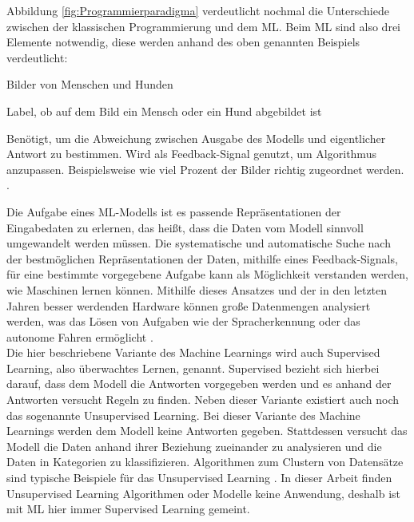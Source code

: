 Abbildung \ref*{fig:Programmierparadigma} verdeutlicht nochmal die Unterschiede zwischen der klassischen Programmierung und dem \ac{ML}. Beim \ac{ML} sind also drei Elemente
notwendig, diese werden anhand des oben genannten Beispiels verdeutlicht: 

\begin{description}[style=multiline,leftmargin=3cm,font=\bfseries]
    \item[Eingabedaten] Bilder von Menschen und Hunden \cite[S.24]{DL_PY}
    \item[Antworten] Label, ob auf dem Bild ein Mensch oder ein Hund abgebildet ist \cite[S.24]{DL_PY}
    \item[Metrik zur Bewertung des Algorithmus] Benötigt, um die Abweichung zwischen Ausgabe des Modells und eigentlicher Antwort zu bestimmen. Wird als Feedback-Signal genutzt,
    um Algorithmus anzupassen. Beispielsweise wie viel Prozent der Bilder richtig zugeordnet werden. \cite[S.24f.]{DL_PY}.  
\end{description}

Die Aufgabe eines \ac{ML}-Modells ist es passende Repräsentationen der Eingabedaten zu erlernen, das heißt, dass die Daten vom Modell sinnvoll umgewandelt werden müssen. 
Die systematische und automatische Suche nach der bestmöglichen Repräsentationen der Daten, mithilfe eines Feedback-Signals, für eine bestimmte vorgegebene Aufgabe kann als Möglichkeit 
verstanden werden, wie Maschinen lernen können. Mithilfe dieses Ansatzes und der in den letzten Jahren besser werdenden Hardware können große Datenmengen analysiert werden, was das Lösen von 
Aufgaben wie der Spracherkennung oder das autonome Fahren ermöglicht \cite[vgl. S.24ff.]{DL_PY}.\\

Die hier beschriebene Variante des Machine Learnings wird auch Supervised Learning, also überwachtes Lernen, genannt. \glqq Supervised\grqq{} bezieht sich hierbei darauf, dass
dem Modell die Antworten vorgegeben werden und es anhand der Antworten versucht Regeln zu finden. Neben dieser Variante existiert auch noch das sogenannte
Unsupervised Learning. Bei dieser Variante des Machine Learnings werden dem Modell keine Antworten gegeben. Stattdessen versucht das Modell die Daten anhand ihrer
Beziehung zueinander zu analysieren und die Daten in Kategorien zu klassifizieren. Algorithmen zum Clustern von Datensätze sind typische Beispiele für das Unsupervised Learning
\cite[vgl. S.47ff.]{AI_Huawei}. In dieser Arbeit finden Unsupervised Learning Algorithmen oder Modelle keine Anwendung, deshalb ist mit \ac{ML} hier immer Supervised Learning gemeint.

